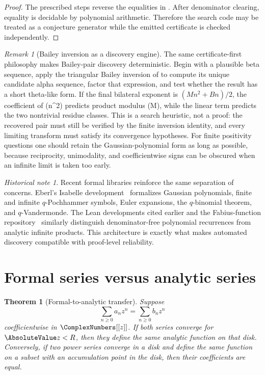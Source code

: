 \documentclass[11pt,a4paper,oneside,openany]{book}
\newtheorem{theorem}{Theorem}[chapter]
\theoremstyle{definition}
\theoremstyle{remark}
\newtheorem{remark}[remark]{Remark}
\newtheorem{historicalnote}[historicalnote]{Historical note}
\begin{document}
\begin{proof}
The prescribed steps reverse the equalities in
.  After denominator clearing, equality is decidable by polynomial arithmetic.  Therefore the search code may be treated as a conjecture generator while the emitted certificate is checked independently.
\end{proof}

\begin{remark}[Bailey inversion as a discovery engine]
The same certificate-first philosophy makes Bailey-pair discovery
deterministic.  Begin with a plausible beta sequence, apply the triangular
Bailey inversion of  to compute its unique candidate
alpha sequence, factor that expression, and test whether the result has a
short theta-like form.  If the final bilateral exponent is
\((Mn^2+Bn)/2\), the coefficient of (n^2) predicts product modulus (M),
while the linear term predicts the two nontrivial residue classes.  This is a
search heuristic, not a proof: the recovered pair must still be verified by
the finite inversion identity, and every limiting transform must satisfy its
convergence hypotheses.  For finite positivity questions one should retain
the Gaussian-polynomial form as long as possible, because reciprocity,
unimodality, and coefficientwise signs can be obscured when an infinite limit
is taken too early.
\end{remark}

\begin{historicalnote}
Recent formal libraries reinforce the same separation of concerns.  Eberl's Isabelle development~\cite{Eberl2024QAnalogues} formalizes Gaussian polynomials, finite and infinite $q$-Pochhammer symbols, Euler expansions, the $q$-binomial theorem, and $q$-Vandermonde.  The Lean developments cited earlier and the Fabius-function repository~\cite{ReshetnikovProveIt2026} similarly distinguish denominator-free polynomial recurrences from analytic infinite products.  This architecture is exactly what makes automated discovery compatible with proof-level reliability.
\end{historicalnote}

\section{Formal series versus analytic series}

\begin{theorem}[Formal-to-analytic transfer]\label{thm:formal-analytic-transfer}
Suppose
\[
 \sum_{n\ge0}a_nz^n=\sum_{n\ge0}b_nz^n
\]
coefficientwise in $\ComplexNumbers[[z]]$.  If both series converge for $\AbsoluteValue z<R$, then they define the same analytic function on that disk.  Conversely, if two power series converge in a disk and define the same function on a subset with an accumulation point in the disk, then their coefficients are equal.
\end{theorem}
\end{document}
